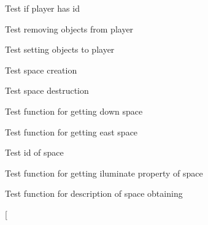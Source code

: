 \begin{DoxyRefList}
\item[\label{test__test000111}%
\hypertarget{test__test000111}{}%
Global \hyperlink{player__test_8c_afa75f333281fc35b24968a5629f09b0b}{test2\+\_\+player\+\_\+has\+\_\+id} ()]Test if player has id  
\item[\label{test__test000120}%
\hypertarget{test__test000120}{}%
Global \hyperlink{player__test_8c_af9e74e12ad6961761f1ff61afa56be3e}{test2\+\_\+player\+\_\+remove\+\_\+object} ()]Test removing objects from player  
\item[\label{test__test000118}%
\hypertarget{test__test000118}{}%
Global \hyperlink{player__test_8c_a9e7db6b857907187146df64abd16aca5}{test2\+\_\+player\+\_\+set\+\_\+object} ()]Test setting objects to player  
\item[\label{test__test000122}%
\hypertarget{test__test000122}{}%
Global \hyperlink{space__test_8c_a012cd3cf37a8d91e2d7098a264c29d65}{test2\+\_\+space\+\_\+create} ()]Test space creation  
\item[\label{test__test000124}%
\hypertarget{test__test000124}{}%
Global \hyperlink{space__test_8c_ad8a5df09bd9f731be1ce6048e92e58c4}{test2\+\_\+space\+\_\+destroy} ()]Test space destruction  
\item[\label{test__test000181}%
\hypertarget{test__test000181}{}%
Global \hyperlink{space__test_8c_a4390a534575e1516d30140e8e40e3b52}{test2\+\_\+space\+\_\+get\+\_\+down} ()]Test function for getting down space  
\item[\label{test__test000162}%
\hypertarget{test__test000162}{}%
Global \hyperlink{space__test_8c_a249293510e61c6d5465f52c14343d02b}{test2\+\_\+space\+\_\+get\+\_\+east} ()]Test function for getting east space  
\item[\label{test__test000126}%
\hypertarget{test__test000126}{}%
Global \hyperlink{space__test_8c_af9087176b0d3c41d83a17a4918b13e31}{test2\+\_\+space\+\_\+get\+\_\+id} ()]Test id of space  
\item[\label{test__test000169}%
\hypertarget{test__test000169}{}%
Global \hyperlink{space__test_8c_ac3a020093f98ed086245f3f80bd4d415}{test2\+\_\+space\+\_\+get\+\_\+iluminate} ()]Test function for getting iluminate property of space  
\item[\label{test__test000144}%
\hypertarget{test__test000144}{}%
Global \hyperlink{space__test_8c_a102af2c9cd571ef59b393a93ecde63aa}{test2\+\_\+space\+\_\+get\+\_\+long\+\_\+description} ()]Test function for description of space obtaining  
\item[\label{test__test000134}%
\hypertarget{test__test000134}{}%

\end{DoxyRefList}
